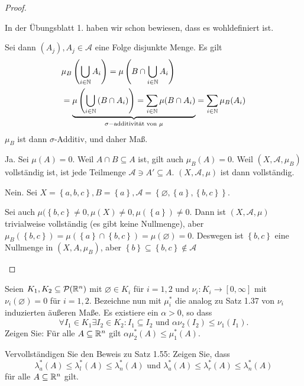 \begin{proof}
	\begin{parts}
	\item In der Übungsblatt 1. haben wir schon bewiesen, dass es wohldefiniert ist.

		Sei dann $(A_j), A_j\in \mathcal{A}$ eine Folge disjunkte Menge. Es gilt
	\begin{align*}
		&\mu_B\left( \bigcup_{i\in\mathbb{N}} A_i \right) =\mu\left( B\cap \bigcup_{i\in \mathbb{N}} A_i \right)\\
		&=\underbrace{\mu\left( \bigcup_{i\in \mathbb{N}} \left( B \cap A_i \right)  \right)=\sum_{i\in \mathbb{N}}\mu(B\cap A_i)}_{\sigma-\text{additivität von }\mu}=\sum_{i\in \mathbb{N}}\mu_B(A_i)
	\end{align*}
		$\mu_B$ ist dann $\sigma$-Additiv, und daher Maß.
	\item Ja. Sei $\mu(A)=0$. Weil $A\cap B\subseteq A$ ist, gilt auch $\mu_B(A)=0$. Weil $(X,\mathcal{A},\mu_B)$ vollständig ist, ist jede Teilmenge $\mathcal{A}\ni A' \subseteq A$. $(X, \mathcal{A},\mu)$ ist dann vollständig.
	\item Nein. Sei $X=\left\{ a,b,c \right\},B=\left\{ a \right\}, \mathcal{A}=\left\{\varnothing, \left\{ a \right\} , \left\{ b,c \right\}  \right\} $.

		Sei auch $\mu(\left\{ b,c \right\} \neq 0, \mu(X)\neq 0, \mu(\left\{ a \right\} )\neq 0$. Dann ist $(X, \mathcal{A},\mu)$ trivialweise vollständig (es gibt keine Nullmenge), aber $\mu_B(\left\{ b,c \right\} )=\mu(\left\{ a \right\} \cap \left\{ b,c \right\} )=\mu(\varnothing)=0$. Deswegen ist $\left\{ b,c \right\} $ eine Nullmenge in $(X,A,\mu_B)$, aber $\left\{ b \right\} \subseteq \left\{b ,c \right\} \not\in \mathcal{A}$
	\end{parts}
\end{proof}
\begin{Problem}
	\begin{parts}
\item	Seien $K_1 , K_2 \subseteq \mathcal{P}(\mathbb{R}^n)$ mit $\varnothing \in K_i$ für $i = 1, 2$ und $\nu_i : K_i \to [0, \infty]$ mit $\nu_i (\varnothing) = 0$ für $i = 1, 2$. Bezeichne nun mit $\mu^*_i$ die analog zu Satz 1.37 von $\nu_i$ induzierten äußeren Maße. Es existiere ein $\alpha > 0$, so dass
	\[
		\forall I_1\in K_1\exists I_2\in K_2: I_1\subseteq I_2\text{ und }\alpha \nu_2(I_2)\le \nu_1(I_1)
	.\] 
	Zeigen Sie: F\"{u}r alle $A\subseteq \mathbb{R}^n$ gilt $\alpha\mu_2^*(A)\le \mu_1^*(A)$.
\item Vervollständigen Sie den Beweis zu Satz 1.55: Zeigen Sie, dass
	\[
		\lambda_a^*(A)\le \lambda_l^*(A)\le \lambda_n^*(A)\text{ und }\lambda_a^*(A)\le \lambda_r^* (A)\le \lambda_n^*(A)\]
		f\"{u}r alle $A\subseteq \mathbb{R}^n$ gilt.
	\end{parts}
\end{Problem}

